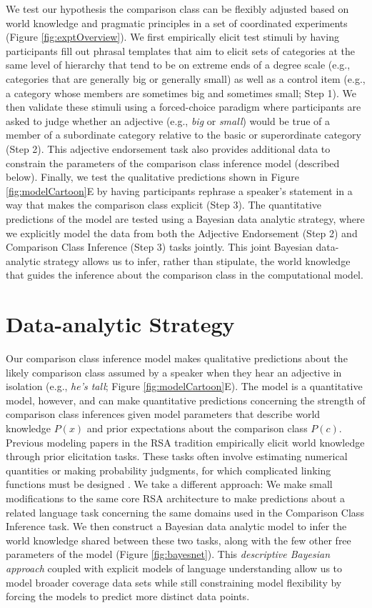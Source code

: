 \documentclass[doc]{apa6}
\begin{document}
We test our hypothesis the comparison class can be flexibly adjusted based on world knowledge and pragmatic principles in a set of coordinated experiments (Figure \ref{fig:exptOverview}).
We first empirically elicit test stimuli by having participants fill out phrasal templates that aim to elicit sets of categories at the same level of hierarchy that tend to be on extreme ends of a degree scale (e.g., categories that are generally big or generally small) as well as a control item (e.g., a category whose members are sometimes big and sometimes small; Step 1). 
We then validate these stimuli using a forced-choice paradigm where participants are asked to judge whether an adjective (e.g., \emph{big} or \emph{small}) would be true of a member of a subordinate category relative to the basic or superordinate category (Step 2). 
This adjective endorsement task also provides additional data to constrain the parameters of the comparison class inference model (described below).
Finally, we test the qualitative predictions shown in Figure \ref{fig:modelCartoon}E by having participants rephrase a speaker's statement in a way that makes the comparison class explicit (Step 3).
The quantitative predictions of the model are tested using a Bayesian data analytic strategy, where we explicitly model the data from both the Adjective Endorsement (Step 2) and Comparison Class Inference (Step 3) tasks jointly.
This joint Bayesian data-analytic strategy allows us to infer, rather than stipulate, the world knowledge that guides the inference about the comparison class in the computational model. 

\section{Data-analytic Strategy}

Our comparison class inference model makes qualitative predictions about the likely comparison class assumed by a speaker when they hear an adjective in isolation (e.g., \emph{he's tall}; Figure \ref{fig:modelCartoon}E). 
The model is a quantitative model, however, and can make quantitative predictions concerning the strength of comparison class inferences given model parameters that describe world knowledge $P(x)$ and prior expectations about the comparison class $P(c)$.
Previous modeling papers in the RSA tradition empirically elicit world knowledge through prior elicitation tasks.
These tasks often involve estimating numerical quantities or making probability judgments, for which complicated linking functions must be designed \cite{Franke2016}. 
We take a different approach: We make small modifications to the same core RSA architecture to make predictions about a related language task concerning the same domains used in the Comparison Class Inference task. 
We then construct a Bayesian data analytic model to infer the world knowledge shared between these two tasks, along with the few other free parameters of the model (Figure \ref{fig:bayesnet}). 
This \emph{descriptive Bayesian approach} \cite{tauber2017} coupled with explicit models of language understanding allow us to model broader coverage data sets while still constraining model flexibility by forcing the models to predict more distinct data points. 
\end{document}
